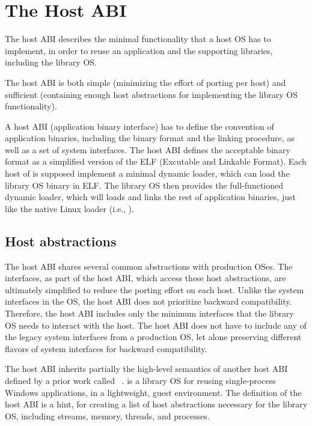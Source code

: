 \section{The Host ABI}
\label{sec:overview:host}

The \graphene{} host ABI describes the minimal functionality that a host OS has to implement, in order to reuse an application and the supporting libraries, including the \graphene{} library OS. 

The \graphene{} host ABI is both simple (minimizing the effort of porting per host) and sufficient (containing enough host abstractions for implementing the library OS functionality).

A host ABI (application binary interface) has to define the convention of application binaries, including the binary format and the linking procedure, as well as a set of  system interfaces.
The host ABI defines the acceptable binary format as a simplified version of the ELF (Excutable and Linkable Format).
Each host of \graphene{} is supposed implement a minimal dynamic loader,
which can load the \graphene{} library OS binary in ELF.
The library OS then provides the full-functioned dynamic loader,
which will loads and links the rest of application binaries, just like the native Linux loader (i.e., ).




\subsection{Host abstractions}
\label{sec:overview:host:abstractions}


The host ABI shares several common abstractions with production OSes. The interfaces, as part of the host ABI, which access these host abstractions, are ultimately simplified to reduce the porting effort on each host.
Unlike the system interfaces in the OS, the host ABI does not prioritize backward compatibility. Therefore, the host ABI includes only the minimum interfaces that the library OS needs to interact with the host. The host ABI does not have to include any of  the legacy system interfaces from a production OS, let alone preserving different flavors of system interfaces for backward compatibility.


The host ABI inherits partially the high-level semantics of another host ABI defined by a prior work called \drawbridge{}~\cite{porter11drawbridge}.
\drawbridge{} is a library OS for reusing single-process Windows applications,
in a lightweight, guest environment.
The definition of the \drawbridge{} host ABI is a hint, for creating a list of host abstractions necessary for the library OS, including streams, memory, threads, and processes. 

